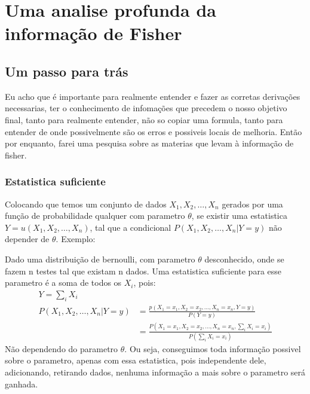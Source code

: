 \chapter{Uma analise profunda da informação de Fisher}
\section{Um passo para trás}
Eu acho que é importante para realmente entender e fazer as corretas derivações necessarias, ter o
conhecimento de infomações que precedem o nosso objetivo final, tanto para realmente entender, não
so copiar uma formula, tanto para entender de onde possivelmente são os erros e possiveis locais de
melhoria. Então por enquanto, farei uma pesquisa sobre as materias que levam à informação de fisher.
\subsection{Estatistica suficiente}
Colocando que temos um conjunto de dados \(X_1,X_2,\ldots ,X_n\) gerados por uma função de
probabilidade qualquer com parametro \(\theta \), se existir uma estatistica
\(Y=u(X_1,X_2,\ldots,X_n)\), tal que a condicional \(P(X_1,X_2,\ldots ,X_n|Y=y)\) não depender de
\(\theta \). Exemplo: \par
Dado uma distribuição de bernoulli, com parametro \(\theta \) desconhecido, onde se fazem n testes
tal que existam n dados. Uma estatistica suficiente para esse parametro é a soma de todos os
\(X_i\), pois:
\begin{align*}
    Y=\sum_{i} X_i \\
    P(X_1,X_2,\ldots ,X_n|Y=y)&=\frac{p(X_1=x_1,X_2=x_2,\ldots ,X_n=x_n,Y=y)}{P(Y=y)}\\
    &=\frac{P(X_1=x_1,X_2=x_2,\ldots ,X_n=x_n,\sum_{i} X_i=x_i)}{P(\sum_{i} X_i=x_i)}
\end{align*}
Não dependendo do parametro \(\theta\). Ou seja, conseguimos toda informação possivel sobre o
parametro, apenas com essa estatistica, pois independente dele, adicionando, retirando dados,
nenhuma informação a mais sobre o parametro será ganhada. \par

